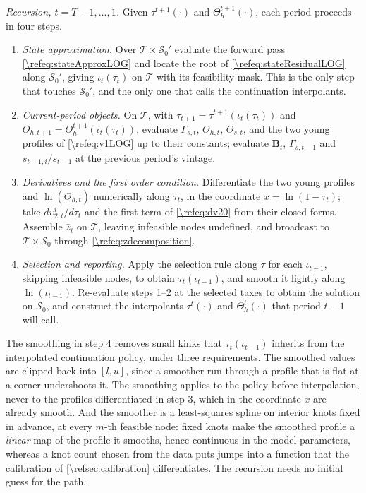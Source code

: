 \begin{alg}
\smallskip\noindent\emph{Recursion, $t = T-1,...,1$.} Given $\tau^{t+1}(\cdot)$ and $\Theta_h^{t+1}(\cdot)$, each period proceeds in four steps.
\begin{enumerate}
    \item \emph{State approximation.} Over $\mathcal{T}\times\mathcal{S}_0'$ evaluate the forward pass \eqref{\refeq:stateApproxLOG} and locate the root of \eqref{\refeq:stateResidualLOG} along $\mathcal{S}_0'$, giving $\iota_t(\tau_t)$ on $\mathcal{T}$ with its feasibility mask. This is the only step that touches $\mathcal{S}_0'$, and the only one that calls the continuation interpolants.
    \item \emph{Current-period objects.} On $\mathcal{T}$, with $\tau_{t+1} = \tau^{t+1}\left(\iota_t(\tau_t)\right)$ and $\Theta_{h,t+1} = \Theta_h^{t+1}\left(\iota_t(\tau_t)\right)$, evaluate $\Gamma_{s,t}$, $\Theta_{h,t}$, $\Theta_{s,t}$, and the two young profiles of \eqref{\refeq:v1LOG} up to their constants; evaluate $\bm{B}_t$, $\Gamma_{s,t-1}$ and $s_{t-1,i}/s_{t-1}$ at the previous period's vintage.
    \item \emph{Derivatives and the first order condition.} Differentiate the two young profiles and $\ln(\Theta_{h,t})$ numerically along $\tau_t$, in the coordinate $x = \ln(1-\tau_t)$; take $d\upsilon_{2,t}^i/d\tau_t$ and the first term of \eqref{\refeq:dv20} from their closed forms. Assemble $\bar{z}_t$ on $\mathcal{T}$, leaving infeasible nodes undefined, and broadcast to $\mathcal{T}\times\mathcal{S}_0$ through \eqref{\refeq:zdecomposition}.
    \item \emph{Selection and reporting.} Apply the selection rule along $\tau$ for each $\iota_{t-1}$, skipping infeasible nodes, to obtain $\tau_t(\iota_{t-1})$, and smooth it lightly along $\ln(\iota_{t-1})$. Re-evaluate steps 1--2 at the selected taxes to obtain the solution on $\mathcal{S}_0$, and construct the interpolants $\tau^t(\cdot)$ and $\Theta_h^t(\cdot)$ that period $t-1$ will call.
\end{enumerate}
The smoothing in step 4 removes small kinks that $\tau_t(\iota_{t-1})$ inherits from the interpolated continuation policy, under three requirements. The smoothed values are clipped back into $[l,u]$, since a smoother run through a profile that is flat at a corner undershoots it. The smoothing applies to the policy before interpolation, never to the profiles differentiated in step 3, which in the coordinate $x$ are already smooth. And the smoother is a least-squares spline on interior knots fixed in advance, at every $m$-th feasible node: fixed knots make the smoothed profile a \emph{linear} map of the profile it smooths, hence continuous in the model parameters, whereas a knot count chosen from the data puts jumps into a function that the calibration of \cref{\refsec:calibration} differentiates. The recursion needs no initial guess for the path.
\end{alg}
